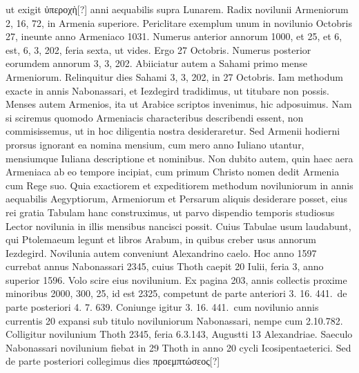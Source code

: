 ut exigit \textgreek{ὐπεροχὴ}[?] anni aequabilis supra Lunarem.
Radix novilunii Armeniorum
2, 16, 72, in Armenia superiore.
Periclitare exemplum %
 unum
in novilunio Octobris 27, ineunte anno Armeniaco 1031.
Numerus
anterior annorum 1000, et 25, et 6, est, 6, 3, 202, feria sexta, ut vides.
Ergo 27 Octobris.
Numerus posterior eorumdem annorum 3, 3, 202.
Abiiciatur autem a Sahami primo mense Armeniorum.
Relinquitur
dies Sahami 3, 3, 202, in 27 Octobris.
Iam methodum exacte
in annis Nabonassari, et
Iezdegird tradidimus, ut
titubare non possis.
Menses
autem Armenios, ita
ut Arabice scriptos invenimus, hic adposuimus.
Nam si sciremus
quomodo Armeniacis
characteribus describendi
essent, non commisissemus,
ut in hoc diligentia
nostra desideraretur.
Sed Armenii hodierni
prorsus ignorant ea nomina
mensium, cum mero %
anno Iuliano utantur,
mensiumque Iuliana descriptione
et nominibus.
Non dubito autem, quin
haec aera Armeniaca ab
eo tempore incipiat, cum
primum Christo nomen
dedit Armenia cum Rege suo.
%
%
Quia exactiorem et expeditiorem methodum noviluniorum in
annis aequabilis Aegyptiorum, Armeniorum et Persarum aliquis
desiderare posset, eius rei gratia Tabulam
hanc construximus, ut parvo
dispendio temporis studiosus Lector
novilunia in illis mensibus nancisci
possit.
%
Cuius Tabulae usum laudabunt,
qui Ptolemaeum legunt et libros
Arabum, in quibus creber usus
annorum Iezdegird.
Novilunia autem
conveniunt Alexandrino caelo.
Hoc anno 1597 currebat annus Nabonassari
2345, cuius Thoth caepit
20 Iulii, feria 3, anno superior 1596.
Volo scire eius novilunium.
Ex pagina
203, annis collectis proxime minoribus
2000, 300, 25, id est 2325,
competunt de parte anteriori 3. 16.
441.\ de parte posteriori 4. 7. 639.
Coniunge igitur 3. 16. 441.\ cum novilunio
annis currentis 20 expansi sub
titulo noviluniorum Nabonassari, nempe cum 2.10.782.
Colligitur
novilunium Thoth 2345, feria 6.3.143, Augustti 13 Alexandriae.
Saeculo Nabonassari novilunium fiebat in 29 Thoth in anno 20
cycli Icosipentaeterici.
Sed de parte posteriori collegimus dies \textgreek{προεμπτώσεος}[?]
